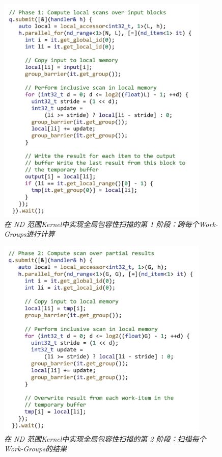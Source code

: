 \begin{figure}[H]
	\centering
	\includegraphics[width=0.9\textwidth]{figs/F14.20.png}
	\caption{\textit{在 ND 范围Kernel中实现全局包容性扫描的第 1 阶段：跨每个Work-Groups进行计算 }}
\end{figure}

\begin{figure}[H]
	\centering
	\includegraphics[width=0.9\textwidth]{figs/F14.21.png}
	\caption{\textit{在 ND 范围Kernel中实现全局包容性扫描的第 2 阶段：扫描每个Work-Groups的结果 }}
\end{figure}

